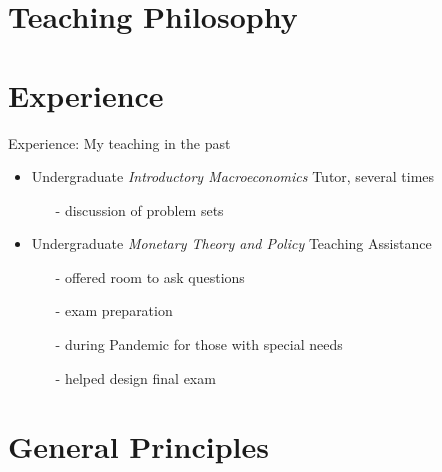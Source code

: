 

\section*{Teaching Philosophy}

\section*{Experience}
\begin{frame}{Experience: My teaching in the past}
	\begin{itemize}[<+->]
		\item Undergraduate \textit{Introductory  Macroeconomics} Tutor, several times
		\vspace{2mm}
		\begin{itemize}
			\item[-] discussion of problem sets
		\end{itemize}
	\vspace{3mm}
		\item Undergraduate \textit{Monetary Theory and Policy} Teaching Assistance
		\vspace{2mm}		
		\begin{itemize}
			\item[-] offered room to ask questions
			\item[-] exam preparation 
			\item[-] during Pandemic for those with special needs
			\item[-] helped design final exam
		\end{itemize}
	\end{itemize}
\end{frame}

\section*{General Principles}

